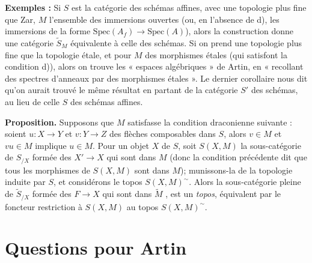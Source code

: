 \documentclass[11pt,a4paper]{article}
\begin{document}
\textbf{Exemples :} Si $S$ est la catégorie des schémas affines, avec une
topologie plus fine que Zar, $M$ l'ensemble des immersions ouvertes (ou, en
l'absence de d), les immersions de la forme
$\mathrm{Spec}(A_f) \to \mathrm{Spec}(A)$), alors la construction donne une
catégorie $\widetilde{S}_M$ équivalente à celle des schémas. Si on prend une
topologie plus fine que la topologie étale, et pour $M$  des
morphismes étales (qui satisfont la condition d)), alors on trouve les
« espaces algébriques » de Artin, en « recollant des spectres d'anneaux par des
morphismes étales ». Le dernier corollaire nous dit qu'on aurait trouvé le même
résultat en partant de la catégorie $S'$ des schémas, au lieu de celle $S$ des
schémas affines. \add{Dans ce cas, les morphismes de $\widetilde{M}$ se disent
\emph{étales} [la top.\ sur $S$ étant la top.\ étale).}


\textbf{Proposition.} Supposons que $M$ satisfasse la condition draconienne
suivante : soient $u : X \to Y$ et $v : Y \to Z$ des flèches composables dans
$S$, alors $v \in M$ et $vu \in M$ implique $u \in M$. Pour un objet $X$ de $S$,
soit $S(X,M)$ la sous-catégorie de $S_{/X}$ formée des $X' \to X$ qui sont dans
$M$ (donc la condition précédente dit que tous les morphismes de $S(X,M)$ sont
dans $M$); munissons-la de la topologie induite par $S$, et considérons le
topos $S(X,M)^{\sim}$. Alors 
la sous-catégorie pleine de $\widetilde{S}_{/X}$ formée des $F \to X$ qui sont
dans $\widetilde{M}$ ,
est un \emph{topos}, équivalent par le foncteur restriction à $S(X,M)$ au topos
$S(X,M)^{\sim}$.


\section*{Questions pour Artin}
\end{document}
